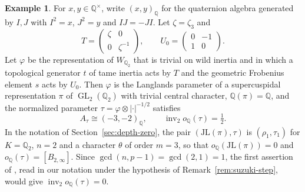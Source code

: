 \documentclass[a4paper,11pt]{amsart}
\theoremstyle{definition}
\newtheorem{example}[theorem]{Example}
\theoremstyle{remark}
\numberwithin{equation}{section}
\newcommand{\Q}{\mathbb{Q}}
\DeclareMathOperator{\inv}{inv}
\DeclareMathOperator{\GL}{GL}
\newcommand{\JL}{\mathrm{JL}}
\begin{document}
\begin{example}\label{ex:dyadic}
For $x,y\in\Q^\times$, write $(x,y)_{\Q}$ for the quaternion algebra generated by $I,J$ with $I^2=x$, $J^2=y$ and $IJ=-JI$. Let $\zeta=\zeta_3$ and
\[
 T=\begin{pmatrix}\zeta&0\\0&\zeta^{-1}\end{pmatrix},\qquad U_0=\begin{pmatrix}0&-1\\1&0\end{pmatrix}.
\]
Let $\varphi$ be the representation of $W_{\Q_2}$ that is trivial on wild inertia and in which a topological generator $t$ of tame inertia acts by $T$ and the geometric Frobenius element $s$ acts by $U_0$. Then $\varphi$ is the Langlands parameter of a supercuspidal representation $\pi$ of $\GL_2(\Q_2)$ with trivial central character, $\Q(\pi)=\Q$, and the normalized parameter $\tau=\varphi\otimes|\cdot|^{-1/2}$ satisfies
\[
 A_\tau\cong(-3,-2)_{\Q},\qquad \inv_2o_{\Q}(\tau)=\tfrac12.
\]
In the notation of Section~\ref{sec:depth-zero}, the pair $(\JL(\pi),\tau)$ is $(\rho_1,\tau_1)$ for $K=\Q_2$, $n=2$ and a character $\theta$ of order $m=3$, so that $o_\Q(\JL(\pi))=0$ and $o_\Q(\tau)=[B_{2,\infty}]$. Since $\gcd(n,p-1)=\gcd(2,1)=1$, the first assertion of \cite[Proposition~4.0.13]{Su23}, read in our notation under the hypothesis of Remark~\ref{rem:suzuki-step}, would give $\inv_2o_{\Q}(\tau)=0$.
\end{example}
\end{document}
